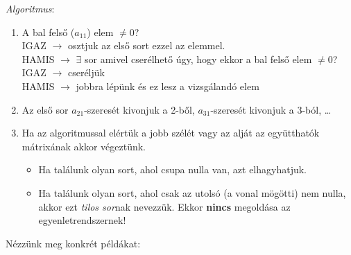 \documentclass[a4paper,12pt,twoside]{book}
\theoremstyle{break}
\newenvironment{myitemize}
{\begin{itemize}
  \setlength{\itemsep}{1pt}
  \setlength{\parskip}{0pt}
  \setlength{\parsep}{0pt}}
{\end{itemize}}
\begin{document}
\textit{Algoritmus}:

\begin{enumerate}
\setlength{\itemsep}{1pt}
\setlength{\parskip}{0pt}
\setlength{\parsep}{0pt}
 \item A bal felső ($a_{11}$) elem $\neq 0$?\\
    IGAZ $\rightarrow$ osztjuk az első sort ezzel az elemmel.\\
    HAMIS $\rightarrow$ $\exists$ sor amivel cserélhető úgy, hogy ekkor a bal felső elem $\neq 0$?\\
    \hspace*{10pt} IGAZ $\rightarrow$ cseréljük\\
    \hspace*{10pt} HAMIS $\rightarrow$ jobbra lépünk és ez lesz a vizsgálandó elem

 \item Az első sor $a_{21}$-szeresét kivonjuk a 2-ből, $a_{31}$-szeresét kivonjuk a 3-ból, \ldots \\
 \item Ha az algoritmussal elértük a jobb szélét vagy az alját az együtthatók mátrixának akkor végeztünk.
    \begin{myitemize}
      \item Ha találunk olyan sort, ahol csupa nulla van, azt elhagyhatjuk.
      \item Ha találunk olyan sort, ahol csak az utolsó (a vonal mögötti) nem nulla, akkor ezt \textit{tilos sor}nak nevezzük. Ekkor \textbf{nincs} megoldása az egyenletrendszernek!
    \end{myitemize}
\end{enumerate}

Nézzünk meg konkrét példákat:\\
\end{document}
